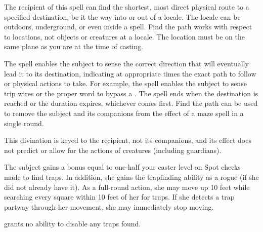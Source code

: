 \begin{spelleffect}
The recipient of this spell can find the shortest, most direct physical route to a specified destination, be it the way into or out of a locale. The locale can be outdoors, underground, or even inside a  spell. Find the path works with respect to locations, not objects or creatures at a locale. The location must be on the same plane as you are at the time of casting.
\par The spell enables the subject to sense the correct direction that will eventually lead it to its destination, indicating at appropriate times the exact path to follow or physical actions to take. For example, the spell enables the subject to sense trip wires or the proper word to bypass a . The spell ends when the destination is reached or the duration expires, whichever comes first. Find the path can be used to remove the subject and its companions from the effect of a maze spell in a single round.
\end{spelleffect}
\begin{spellnotes}
This divination is keyed to the recipient, not its companions, and its effect does not predict or allow for the actions of creatures (including guardians).
\end{spellnotes}

\spelldur{\durmed}
\begin{spelleffect}
The subject gains a bonus equal to one-half your caster level on Spot checks made to find traps. In addition, she gains the trapfinding ability as a rogue (if she did not already have it). As a full-round action, she may move up 10 feet while searching every square within 10 feet of her for traps. If she detects a trap partway through her movement, she may immediately stop moving.
\end{spelleffect}
\begin{spellnotes}
 grants no ability to disable any traps found.
\end{spellnotes}

